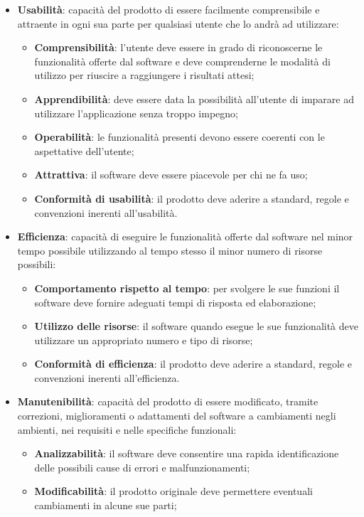 \begin{itemize}
\item\textbf{Usabilità}: capacità del prodotto di essere facilmente comprensibile e attraente in ogni sua parte per qualsiasi utente che lo andrà ad utilizzare:
\begin{itemize}
\item\textbf{Comprensibilità}: l'utente deve essere in grado di riconoscerne le funzionalità offerte dal software e deve comprenderne le modalità di utilizzo per riuscire a raggiungere i risultati attesi;
\item\textbf{Apprendibilità}: deve essere data la possibilità all'utente di imparare ad utilizzare l'applicazione senza troppo impegno;
\item\textbf{Operabilità}: le funzionalità presenti devono essere coerenti con le aspettative dell'utente;
\item\textbf{Attrattiva}: il software deve essere piacevole per chi ne fa uso;
\item\textbf{Conformità di usabilità}: il prodotto deve aderire a standard, regole e convenzioni inerenti all'usabilità.
\end{itemize}
\item\textbf{Efficienza}: capacità di eseguire le funzionalità offerte dal software nel minor tempo possibile utilizzando al tempo stesso il minor numero di risorse possibili:
\begin{itemize}
\item\textbf{Comportamento rispetto al tempo}: per svolgere le sue funzioni il software deve fornire adeguati tempi di risposta ed elaborazione;
\item\textbf{Utilizzo delle risorse}: il software quando esegue le sue funzionalità deve utilizzare un appropriato numero e tipo di risorse;
\item\textbf{Conformità di efficienza}: il prodotto deve aderire a standard, regole e convenzioni inerenti all'efficienza.
\end{itemize}
\item\textbf{Manutenibilità}: capacità del prodotto di essere modificato, tramite correzioni, miglioramenti o adattamenti del software a cambiamenti negli ambienti, nei requisiti e nelle specifiche funzionali:
\begin{itemize}
\item\textbf{Analizzabilità}: il software deve consentire una rapida identificazione delle possibili cause di errori e malfunzionamenti;
\item\textbf{Modificabilità}: il prodotto originale deve permettere eventuali cambiamenti in alcune sue parti;

\end{itemize}
\end{itemize}
